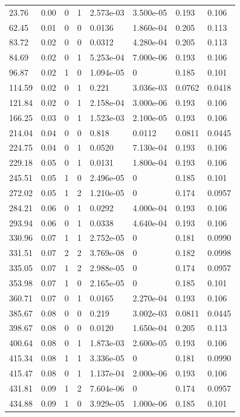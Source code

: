 \documentclass[preview]{standalone}
\begin{document}
{{\begin{tabular}{L{1.2cm}C{1.2cm} C{0.3cm}C{0.5cm} C{1.4cm}C{1.4cm} C{1.4cm}C{1.4cm}}
  23.76  &  0.00  & 0     &  1 &  2.573e-03  & 3.500e-05  & 0.193 &  0.106   \\ 
  62.45  &  0.01  & 0     &  0 &  0.0136  & 1.860e-04  & 0.205 &  0.113   \\ 
  83.72  &  0.02  & 0     &  0 &  0.0312  & 4.280e-04  & 0.205 &  0.113   \\ 
  84.69  &  0.02  & 0     &  1 &  5.253e-04  & 7.000e-06  & 0.193 &  0.106   \\ 
  96.87  &  0.02  & 1     &  0 &  1.094e-05  & 0  & 0.185 &  0.101   \\ 
  114.59  &  0.02  & 0     &  1 &  0.221  & 3.036e-03  & 0.0762 &  0.0418   \\ 
  121.84  &  0.02  & 0     &  1 &  2.158e-04  & 3.000e-06  & 0.193 &  0.106   \\ 
  166.25  &  0.03  & 0     &  1 &  1.523e-03  & 2.100e-05  & 0.193 &  0.106   \\ 
  214.04  &  0.04  & 0     &  0 &  0.818  & 0.0112  & 0.0811 &  0.0445   \\ 
  224.75  &  0.04  & 0     &  1 &  0.0520  & 7.130e-04  & 0.193 &  0.106   \\ 
  229.18  &  0.05  & 0     &  1 &  0.0131  & 1.800e-04  & 0.193 &  0.106   \\ 
  245.51  &  0.05  & 1     &  0 &  2.496e-05  & 0  & 0.185 &  0.101   \\ 
  272.02  &  0.05  & 1     &  2 &  1.210e-05  & 0  & 0.174 &  0.0957   \\ 
  284.21  &  0.06  & 0     &  1 &  0.0292  & 4.000e-04  & 0.193 &  0.106   \\ 
  293.94  &  0.06  & 0     &  1 &  0.0338  & 4.640e-04  & 0.193 &  0.106   \\ 
  330.96  &  0.07  & 1     &  1 &  2.752e-05  & 0  & 0.181 &  0.0990   \\ 
  331.51  &  0.07  & 2     &  2 &  3.769e-08  & 0  & 0.182 &  0.0998   \\ 
  335.05  &  0.07  & 1     &  2 &  2.988e-05  & 0  & 0.174 &  0.0957   \\ 
  353.98  &  0.07  & 1     &  0 &  2.165e-05  & 0  & 0.185 &  0.101   \\ 
  360.71  &  0.07  & 0     &  1 &  0.0165  & 2.270e-04  & 0.193 &  0.106   \\ 
  385.67  &  0.08  & 0     &  0 &  0.219  & 3.002e-03  & 0.0811 &  0.0445   \\ 
  398.67  &  0.08  & 0     &  0 &  0.0120  & 1.650e-04  & 0.205 &  0.113   \\ 
  400.64  &  0.08  & 0     &  1 &  1.873e-03  & 2.600e-05  & 0.193 &  0.106   \\ 
  415.34  &  0.08  & 1     &  1 &  3.336e-05  & 0  & 0.181 &  0.0990   \\ 
  415.47  &  0.08  & 0     &  1 &  1.137e-04  & 2.000e-06  & 0.193 &  0.106   \\ 
  431.81  &  0.09  & 1     &  2 &  7.604e-06  & 0  & 0.174 &  0.0957   \\ 
  434.88  &  0.09  & 1     &  0 &  3.929e-05  & 1.000e-06  & 0.185 &  0.101   \\ 
\hline 
\end{tabular} 

}}
\end{document}
